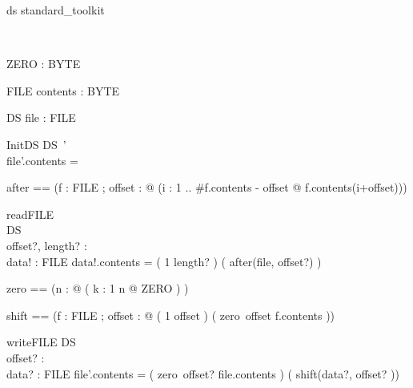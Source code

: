 \begin{zsection}
  \SECTION ds \parents standard\_toolkit
\end{zsection}

\begin{zed}
[BYTE] \\
\end{zed}

\begin{axdef}
ZERO : BYTE \\
\end{axdef}

\begin{schema}{FILE}
	contents : \seq BYTE
\end{schema}

\begin{schema}{DS}
	file : FILE
\end{schema}

\begin{schema}{InitDS}
	DS~' \\
\where
	file'.contents = \langle \rangle
\end{schema}

\begin{zed}
  after ==
  (\lambda f : FILE ; offset : \nat 
     @ (\lambda i : 1 .. \#f.contents - offset @ f.contents(i+offset)))
\end{zed}

\begin{schema}{readFILE}\\
  \Xi DS \\
  offset?, length? : \nat \\
  data! : FILE
\where
  data!.contents = ( 1 \upto length? ) \dres ( after(file, offset?) )
\end{schema}

\begin{zed}
  zero == (\lambda n : \nat @ ( \lambda k : 1 \upto n @ ZERO ) )
\end{zed}

\begin{zed}
  shift  == (\lambda f : FILE ; offset : \nat @ ( 1 \upto offset ) \ndres ( zero~offset \cat f.contents ))
\end{zed}

\begin{schema}{writeFILE}
  \Delta DS \\
  offset? : \nat \\
  data? : FILE
\where
  file'.contents = ( zero~offset? \oplus file.contents ) \oplus ( shift(data?, offset?  ))
\end{schema}

